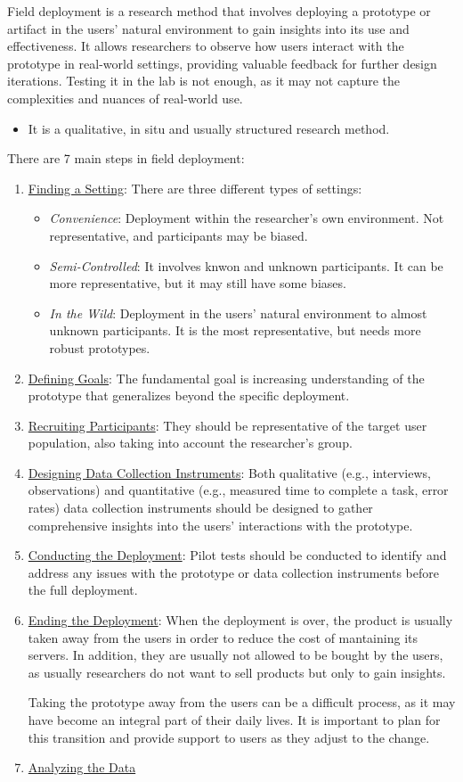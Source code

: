 Field deployment is a research method that involves deploying a prototype or artifact in the users' natural environment to gain insights into its use and effectiveness. It allows researchers to observe how users interact with the prototype in real-world settings, providing valuable feedback for further design iterations. Testing it in the lab is not enough, as it may not capture the complexities and nuances of real-world use.
\begin{itemize}
    \item It is a qualitative, in situ and usually structured research method.
\end{itemize}

There are 7 main steps in field deployment:
\begin{enumerate}
    \item \ul{Finding a Setting}: There are three different types of settings:
    \begin{itemize}
        \item \emph{Convenience}: Deployment within the researcher's own environment. Not representative, and participants may be biased.
        \item \emph{Semi-Controlled}: It involves knwon and unknown participants. It can be more representative, but it may still have some biases.
        \item \emph{In the Wild}: Deployment in the users' natural environment to almost unknown participants. It is the most representative, but needs more robust prototypes.
    \end{itemize}
    \item \ul{Defining Goals}: The fundamental goal is increasing understanding of the prototype that generalizes beyond the specific deployment.
    \item \ul{Recruiting Participants}: They should be representative of the target user population, also taking into account the researcher's group.
    \item \ul{Designing Data Collection Instruments}: Both qualitative (e.g., interviews, observations) and quantitative (e.g., measured time to complete a task, error rates) data collection instruments should be designed to gather comprehensive insights into the users' interactions with the prototype.
    \item \ul{Conducting the Deployment}: Pilot tests should be conducted to identify and address any issues with the prototype or data collection instruments before the full deployment.
    \item \ul{Ending the Deployment}: When the deployment is over, the product is usually taken away from the users in order to reduce the cost of mantaining its servers. In addition, they are usually not allowed to be bought by the users, as usually researchers do not want to sell products but only to gain insights.
    
    Taking the prototype away from the users can be a difficult process, as it may have become an integral part of their daily lives. It is important to plan for this transition and provide support to users as they adjust to the change.
    \item \ul{Analyzing the Data}
\end{enumerate}


